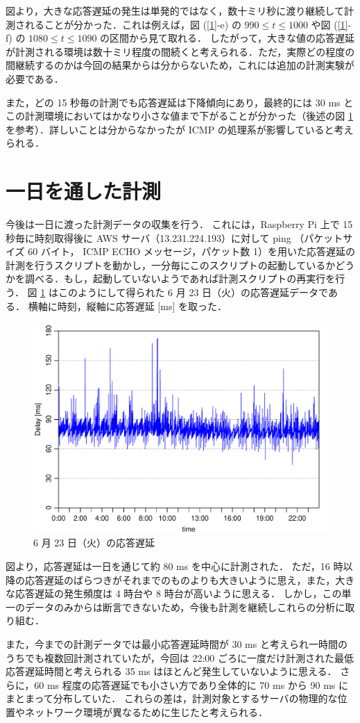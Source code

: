 \documentclass[a4j]{jarticle}
\begin{document}
図より，大きな応答遅延の発生は単発的ではなく，数十ミリ秒に渡り継続して計測されることが分かった．これは例えば，図 (\ref{1}-e) の $990 \leq t \leq 1000$ や図 (\ref{1}-f) の $1080 \leq t \leq 1090$ の区間から見て取れる．
したがって，大きな値の応答遅延が計測される環境は数十ミリ程度の間続くと考えられる．ただ，実際どの程度の間継続するのかは今回の結果からは分からないため，これには追加の計測実験が必要である．

また，どの 15 秒毎の計測でも応答遅延は下降傾向にあり，最終的には 30 ms とこの計測環境においてはかなり小さな値まで下がることが分かった（後述の図 \ref{6-23} を参考）．詳しいことは分からなかったが ICMP の処理系が影響していると考えられる．
\section{一日を通した計測}
今後は一日に渡った計測データの収集を行う．
これには，Raspberry Pi 上で 15 秒毎に時刻取得後に AWS サーバ（13.231.224.193）に対して ping （パケットサイズ 60 バイト， ICMP ECHO メッセージ，パケット数 1）を用いた応答遅延の計測を行うスクリプトを動かし，一分毎にこのスクリプトの起動しているかどうかを調べる．もし，起動していないようであれば計測スクリプトの再実行を行う．
図 \ref{6-23} はこのようにして得られた 6 月 23 日（火）の応答遅延データである．
横軸に時刻，縦軸に応答遅延 [ms] を取った．

\begin{figure}[tb]
\centering
\includegraphics[width=0.9\hsize]{plot-6-23.pdf}
\caption{6 月 23 日（火）の応答遅延}
\label{6-23}
\end{figure}

図より，応答遅延は一日を通じて約 80 ms を中心に計測された．
ただ，16 時以降の応答遅延のばらつきがそれまでのものよりも大きいように思え，また，大きな応答遅延の発生頻度は 4 時台や 8 時台が高いように思える．
しかし，この単一のデータのみからは断言できないため，今後も計測を継続しこれらの分析に取り組む．

また，今までの計測データでは最小応答遅延時間が 30 ms と考えられ一時間のうちでも複数回計測されていたが，今回は 22:00 ごろに一度だけ計測された最低応答遅延時間と考えられる 35 ms はほとんど発生していないように思える．
さらに，60 ms 程度の応答遅延でも小さい方であり全体的に 70 ms から 90 ms にまとまって分布していた．
これらの差は，計測対象とするサーバの物理的な位置やネットワーク環境が異なるために生じたと考えられる．


\end{document}
